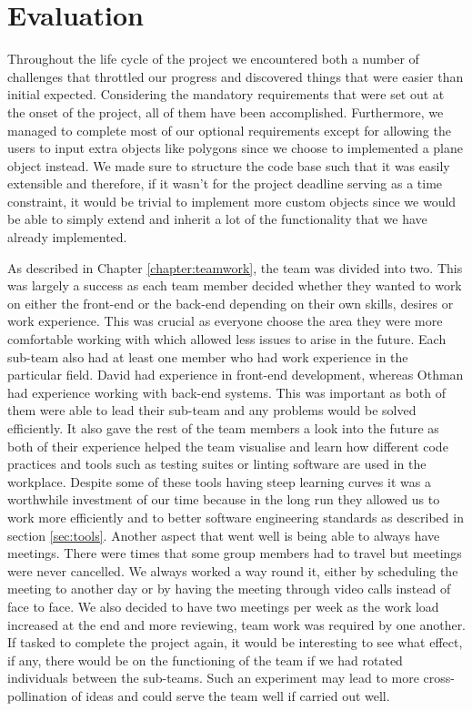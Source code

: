 \documentclass[a4paper]{report}
\begin{document}
	\chapter{Evaluation}
	Throughout the life cycle of the project we encountered both a number of challenges that throttled our progress and discovered things that were easier than initial expected. Considering the mandatory requirements that were set out at the onset of the project, all of them have been accomplished. Furthermore, we managed to complete most of our optional requirements except for allowing the users to input extra objects like polygons since we choose to implemented a plane object instead. We made sure to structure the code base such that it was easily extensible and therefore, if it wasn't for the project deadline serving as a time constraint, it would be trivial to implement more custom objects since we would be able to simply extend and inherit a lot of the functionality that we have already implemented. \newline
	
	\par As described in Chapter \ref{chapter:teamwork}, the team was divided into two. This was largely a success as each team member decided whether they wanted to work on either the front-end or the back-end depending on their own skills, desires or work experience. This was crucial as everyone choose the area they were more comfortable working with which allowed less issues to arise in the future. Each sub-team also had at least one member who had work experience in the particular field. David had experience in front-end development, whereas Othman had experience working with back-end systems. This was important as both of them were able to lead their sub-team and any problems would be solved efficiently. It also gave the rest of the team members a look into the future as both of their experience helped the team visualise and learn how different code practices and tools such as testing suites or linting software are used in the workplace. Despite some of these tools having steep learning curves it was a worthwhile investment of our time because in the long run they allowed us to work more efficiently and to better software engineering standards as described in section \ref{sec:tools}. Another aspect that went well is being able to always have meetings. There were times that some group members had to travel but meetings were never cancelled. We always worked a way round it, either by scheduling the meeting to another day or by having the meeting through video calls instead of face to face. We also decided to have two meetings per week as the work load increased at the end and more reviewing, team work was required by one another. If tasked to complete the project again, it would be interesting to see what effect, if any, there would be on the functioning of the team if we had rotated individuals between the sub-teams. Such an experiment may lead to more cross-pollination of ideas and could serve the team well if carried out well. \newline 
	
\end{document}
